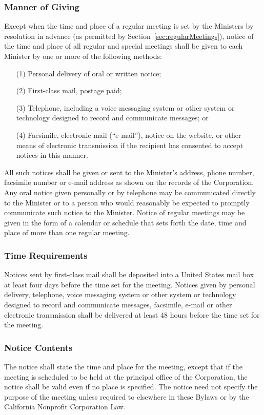 \documentclass[letterpaper,titlepage]{article}
\begin{document}
\subsubsection{Manner of Giving}
\label{sec:mannerGiving}
Except when the time and place of a regular meeting is set by the Ministers by
resolution in advance (as permitted by Section~\ref{sec:regularMeetings}), notice of the time and place of all regular and special meetings shall be given to each Minister by one or more of the following methods:
\begin{itemize}
    \item[(1)] Personal delivery of oral or written notice;
    \item[(2)] First-class mail, postage paid;
    \item[(3)] Telephone, including a voice messaging system or other system or technology designed to record and communicate messages; or
    \item[(4)] Facsimile, electronic mail (``e-mail''), notice on the website, or other means of electronic transmission if the recipient has consented to accept notices in this manner.
\end{itemize}
All such notices shall be given or sent to the Minister's address, phone number, facsimile number or e-mail address as shown on the records of the Corporation.  Any oral notice given personally or by telephone may be communicated directly to the Minister or to a person who would reasonably be expected to promptly communicate such notice to the Minister. Notice of regular meetings may be given in the form of a calendar or schedule that sets forth the date, time and place of more than one regular meeting.
\subsubsection{Time Requirements}
\label{sec:timeRequirements}
Notices sent by first-class mail shall be deposited into a United States mail box at least four days before the time set for the meeting. Notices given by personal delivery, telephone, voice messaging system or other system or technology designed to record and communicate messages, facsimile, e-mail or other electronic transmission shall be delivered at least 48 hours before the time set for the meeting.
\subsubsection{Notice Contents}
\label{sec:noticeContents}
The notice shall state the time and place for the meeting, except that if the meeting is scheduled to be held at the principal office of the Corporation, the notice shall be valid even if no place is specified. The notice need not specify the purpose of the meeting unless required to elsewhere in these Bylaws or by the California Nonprofit Corporation Law.
\end{document}
